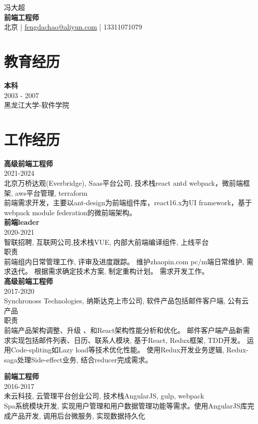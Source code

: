 \documentclass[a4paper,9pt]{extarticle}
\begin{document}
\pagestyle{empty}

\begin{center}
冯大超\\[3pt] %
\textbf{前端工程师}\\[1pt] %
北京 | \href{mailto:fengdachao@aliyun.com}{fengdachao@aliyun.com} | 13311071079 %
\end{center}


\section*{教育经历}
\noindent
\newline
\textbf{本科} \\
2003 - 2007 \\ 
黑龙江大学-软件学院 \\


\section*{工作经历}
\newline
\noindent
\textbf{高级前端工程师} \\
2021-2024 \\
北京万桥达观(Everbridge), Saas平台公司, 技术栈react antd webpack，微前端框架, aws平台管理, terraform \\
前端需求开发，主要以ant-design为前端组件库，react16.x为UI framework，基于webpack module federation的微前端架构。 \\

\noindent
\textbf{前端leader} \\
2020-2021 \\
智联招聘, 互联网公司,技术栈VUE, 内部大前端编译组件, 上线平台 \\ 
职责\\
前端组内日常管理工作, 评审及进度跟踪。 维护zhaopin.com pc/m端日常维护, 需求迭代。 根据需求确定技术方案, 制定重构计划。 需求开发工作。 \\ 

\noindent
\textbf{高级前端工程师} \\
2017-2020 \\
Synchronoss Technologies, 纳斯达克上市公司, 软件产品包括邮件客户端, 公有云产品 \\
职责\\
前端产品架构调整、升级 、和React架构性能分析和优化。 邮件客户端产品新需求实现包括邮件列表、日历、联系人模块, 基于React, Redux框架, TDD开发。 运用Code-spliting如Lazy load等技术优化性能。 使用Redux开发业务逻辑, Redux-saga处理Side-effect业务, 结合reducer完成需求。

\noindent
\textbf{前端工程师} \\
2016-2017  \\
未云科技, 云管理平台创业公司, 技术栈AngularJS, gulp, webpack\\
Spa系统模块开发, 实现用户管理和用户数据管理功能等需求。使用AngularJS库完成产品开发, 调用后台微服务, 实现数据持久化 \\


\end{document}
